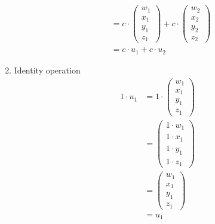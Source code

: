 \documentclass[12pt,letterpaper,fleqn]{article}
\theoremstyle{definition}
\begin{document}
\begin{enumerate}
\begin{equation*}
\begin{split}
&= c \cdot \begin{pmatrix}
w_1\\
x_1\\
y_1\\
z_1
\end{pmatrix} + c \cdot \begin{pmatrix}
w_2\\
x_2\\
y_2\\
z_2
\end{pmatrix}\\
&= c \cdot u_1 + c \cdot u_2
\end{split}
\end{equation*}

\item Identity operation
\begin{equation*}
\begin{split}
1 \cdot u_1 &= 1 \cdot
\begin{pmatrix}
w_1\\
x_1\\
y_1\\
z_1
\end{pmatrix}\\
&= \begin{pmatrix}
1 \cdot w_1\\
1 \cdot x_1\\
1 \cdot y_1\\
1 \cdot z_1
\end{pmatrix}\\
&= \begin{pmatrix}
w_1\\
x_1\\
y_1\\
z_1
\end{pmatrix}\\
&= u_1
\end{split}
\end{equation*}
\end{enumerate}
\end{document}
